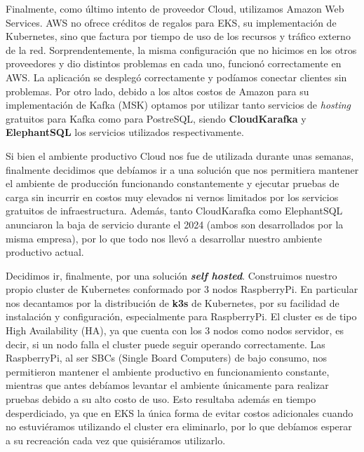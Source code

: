 Finalmente, como último intento de proveedor Cloud, utilizamos Amazon Web Services. AWS no ofrece créditos de regalos para EKS, su implementación de Kubernetes, sino que factura por tiempo
de uso de los recursos y tráfico externo de la red. Sorprendentemente, la misma configuración que no hicimos en los otros proveedores y dio distintos problemas en cada uno, funcionó correctamente
en AWS. La aplicación se desplegó correctamente y podíamos conectar clientes sin problemas. Por otro lado, debido a los altos costos de Amazon para su implementación de Kafka (MSK) optamos por utilizar
tanto servicios de \textit{hosting} gratuitos para Kafka como para PostreSQL, siendo \textbf{CloudKarafka} y \textbf{ElephantSQL} los servicios utilizados respectivamente.

Si bien el ambiente productivo Cloud nos fue de utilizada durante unas semanas, finalmente decidimos que debíamos ir a una solución que nos permitiera mantener el ambiente de producción funcionando constantemente
y ejecutar pruebas de carga sin incurrir en costos muy elevados ni vernos limitados por los servicios gratuitos de infraestructura. Además, tanto CloudKarafka como ElephantSQL anunciaron la baja de servicio
durante el 2024 (ambos son desarrollados por la misma empresa), por lo que todo nos llevó a desarrollar nuestro ambiente productivo actual.

Decidimos ir, finalmente, por una solución \textbf{\textit{self hosted}}. Construimos nuestro propio cluster de Kubernetes conformado por 3 nodos RaspberryPi. En particular nos decantamos por la distribución de
\textbf{k3s} de Kubernetes, por su facilidad de instalación y configuración, especialmente para RaspberryPi. El cluster es de tipo High Availability (HA), ya que cuenta con los 3 nodos como nodos servidor, es decir,
si un nodo falla el cluster puede seguir operando correctamente. Las RaspberryPi, al ser SBCs (Single Board Computers) de bajo consumo, nos permitieron mantener el ambiente productivo en funcionamiento
constante, mientras que antes debíamos levantar el ambiente únicamente para realizar pruebas debido a su alto costo de uso. Esto resultaba además en tiempo desperdiciado, ya que en EKS la única forma de evitar costos adicionales
cuando no estuviéramos utilizando el cluster era eliminarlo, por lo que debíamos esperar a su recreación cada vez que quisiéramos utilizarlo.

